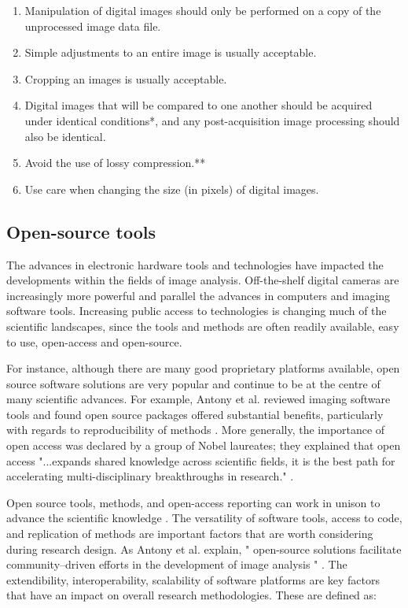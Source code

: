 \begin{enumerate}
\item Manipulation of digital images should only be performed on a copy of the unprocessed image data file.
\item Simple adjustments to an entire image is usually acceptable.
\item Cropping an images is usually acceptable.
\item Digital images that will be compared to one another should be acquired under identical conditions*, and any post-acquisition image processing should also be identical.
\item Avoid the use of lossy compression.**
\item Use care when changing the size (in pixels) of digital images.
\end{enumerate}

\subsection{Open-source tools}
The advances in electronic hardware tools and technologies have impacted the developments within the fields of image analysis. Off-the-shelf digital cameras are increasingly more powerful and parallel the advances in computers and imaging software tools. Increasing public access to technologies is changing much of the scientific landscapes, since the tools and methods are often readily available, easy to use, open-access and open-source.

For instance, although there are many good proprietary platforms available, open source software solutions are very popular and continue to be at the centre of many scientific advances. For example, Antony et al. \cite{Antony2013} reviewed imaging software tools and found open source packages offered substantial benefits, particularly with regards to reproducibility of methods \cite{Schindelin2012,Bouckaert2010weka}.  More generally, the importance of open access was declared by a group of Nobel laureates; they explained that open access "...expands shared knowledge across scientific fields, it is the best path for accelerating multi-disciplinary breakthroughs in research." \cite{Openaccess}. 

Open source tools, methods, and open-access reporting can work in unison to advance the scientific knowledge \cite{Sonnenburg2007}. The versatility of software tools, access to code, and replication of methods are important factors that are worth considering during research design. As Antony et al. \cite{Antony2013} explain, " open-source solutions facilitate community--driven efforts in the development of image analysis " \cite[pg.13]{Antony2013}. The extendibility, interoperability, scalability of software platforms are key factors that have an impact on overall research methodologies. These are defined as:

